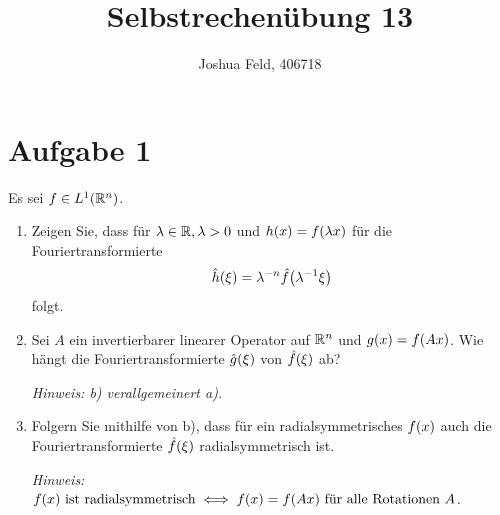 \documentclass{exercise}
\institute{Applied and Computational Mathematics}
\title{Selbstrechenübung 13}
\author{Joshua Feld, 406718}
\begin{document}
    \maketitle


    \section*{Aufgabe 1}
    
    \begin{problem}
        Es sei \(f \in L^1\parentheses*{\R^n}\).
        \begin{enumerate}
            \item Zeigen Sie, dass für \(\lambda \in \mathbb{R}, \lambda > 0\) und \(h\parentheses*{x} = f\parentheses*{\lambda x}\) für die Fouriertransformierte
            \[
                \hat{h}\parentheses*{\xi} = \lambda^{-n}\hat{f}\parentheses*{\lambda^{-1}\xi}
            \]
            folgt.
            \item Sei \(A\) ein invertierbarer linearer Operator auf \(\mathbb{R}^n\) und \(g\parentheses*{x} = f\parentheses*{Ax}\).
            Wie hängt die Fouriertransformierte \(\hat{g}\parentheses*{\xi}\) von \(\hat{f}\parentheses*{\xi}\) ab?

            \emph{Hinweis: b) verallgemeinert a).}
            \item Folgern Sie mithilfe von b), dass für ein radialsymmetrisches \(f\parentheses*{x}\) auch die Fouriertransformierte \(\hat{f}\parentheses*{\xi}\) radialsymmetrisch ist.

            \emph{Hinweis: \(f\parentheses*{x}\text{ ist radialsymmetrisch} \iff f\parentheses*{x} = f\parentheses*{Ax}\text{ für alle Rotationen }A\).}
        \end{enumerate}
    \end{problem}
    
\end{document}
